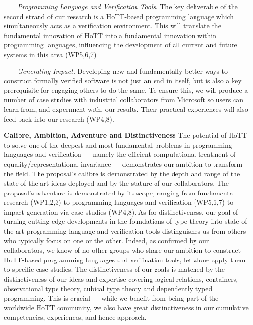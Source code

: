 \documentclass[a4paper,11pt]{article}
\begin{document}
$\;\;\;\;\;\;$ {\em Programming Language and Verification Tools.} The key
  deliverable of the second strand of our research is a HoTT-based
  programming language which simultaneously acts as a verification
  environment. This will translate the fundamental innovation of HoTT
  into a fundamental innovation within programming languages,
  influencing the development of all current and future systems in
  this area (WP5,6,7).

  $\;\;\;\;\;\;$ {\em Generating Impact.} Developing new and
  fundamentally better ways to construct formally verified software is
  not just an end in itself, but is also a key prerequisite for
  engaging others to do the same.  To ensure this, we will produce a
  number of case studies with industrial collaborators from Microsoft so users can
  learn from, and experiment with, our results. Their practical
  experiences will also feed back into our research (WP4,8).

  {\bf Calibre, Ambition, Adventure and Distinctiveness} The potential
  of HoTT to solve one of the deepest and most fundamental problems in
  programming languages and verification --- namely the efficient
  computational treatment of equality/representational invariance ---
  demonstrates our ambition to transform the field. The proposal's
  calibre is demonstrated by the depth and range of the
  state-of-the-art ideas deployed and by the stature of our
  collaborators. The proposal's adventure is demonstrated by its
  scope, ranging from fundamental research (WP1,2,3) to programming
  languages and verification (WP5,6,7) to impact generation via case
  studies (WP4,8).  As for distinctiveness, our goal of turning
  cutting-edge developments in the foundations of type theory into
  state-of-the-art programming language and verification tools
  distinguishes us from others who typically focus on one or the
  other. Indeed, as confirmed by our collaborators, we know of no
  other groups who share our ambition to construct HoTT-based
  programming languages and verification tools, let alone apply them
  to specific case studies.  The distinctiveness of our goals is
  matched by the distinctiveness of our ideas and expertise covering
  logical relations, containers, observational type theory, cubical
  type theory and dependently typed programming. This is crucial ---
  while we benefit from being part of the worldwide HoTT community, we
  also have great distinctiveness in our cumulative competencies,
  experiences, and hence approach.

\vspace*{-0.1in} 
\end{document}

